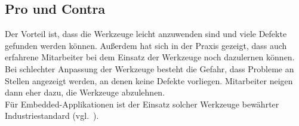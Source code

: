 \subsection*{Pro und Contra}
Der Vorteil ist, dass die Werkzeuge leicht anzuwenden sind und viele Defekte gefunden werden können.
Außerdem hat sich in der Praxis gezeigt, dass auch erfahrene Mitarbeiter bei dem Einsatz der Werkzeuge noch dazulernen können.\\
Bei schlechter Anpassung der Werkzeuge besteht die Gefahr, dass Probleme an Stellen angezeigt werden, an denen keine Defekte vorliegen.
Mitarbeiter neigen dann eher dazu, die Werkzeuge abzulehnen.\\
Für Embedded-Applikationen ist der Einsatz solcher Werkzeuge bewährter Industriestandard (vgl.~\cite[31]{Wed09c}).
